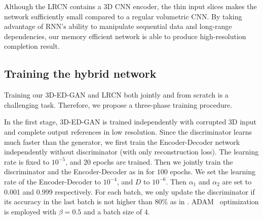 \documentclass[10pt,twocolumn,letterpaper]{article}
\begin{document}
Although the LRCN contains a 3D CNN encoder, the thin input slices makes the network sufficiently small compared to a regular volumetric CNN. By taking advantage of RNN's ability to manipulate sequential data and long-range dependencies, our memory efficient network is able to produce high-resolution completion result.
\subsection{Training the hybrid network}
\label{sec:training}


Training our 3D-ED-GAN and LRCN both jointly and from scratch is a challenging task. Therefore, we propose a three-phase training procedure. 

In the first stage, 3D-ED-GAN is trained independently with corrupted 3D input and complete output references in low resolution. Since the discriminator learns much faster than the generator, we first train the Encoder-Decoder network independently without discriminator (with only reconstruction loss).  The learning rate is fixed to $10^{-5}$, and $20$ epochs are trained. Then we jointly train the discriminator and the Encoder-Decoder as in \cite{dcgan} for $100$ epochs.  We set the learning rate of the Encoder-Decoder to $10^{-4}$, and $D$ to $10^{-6}$. Then $\alpha_1$ and $\alpha_2$ are set to 0.001 and 0.999 respectively. For each batch, we only update the discriminator if its accuracy in the last batch is not higher than 80\% as in \cite{3dgan}. ADAM~\cite{adam} optimization is employed with $\beta=0.5$ and a batch size of $4$.
\end{document}

